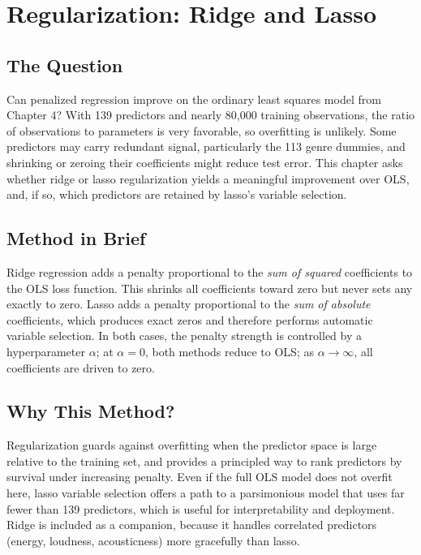 \documentclass[12pt, oneside]{book}
\begin{document}
\chapter{Regularization: Ridge and Lasso}
 
\section{The Question}
 
Can penalized regression improve on the ordinary least squares model from Chapter 4? With 139 predictors and nearly 80{,}000 training observations, the ratio of observations to parameters is very favorable, so overfitting is unlikely. Some predictors may carry redundant signal, particularly the 113 genre dummies, and shrinking or zeroing their coefficients might reduce test error. This chapter asks whether ridge or lasso regularization yields a meaningful improvement over OLS, and, if so, which predictors are retained by lasso's variable selection.
 
\section{Method in Brief}
 
Ridge regression adds a penalty proportional to the \textit{sum of squared} coefficients to the OLS loss function. This shrinks all coefficients toward zero but never sets any exactly to zero. Lasso adds a penalty proportional to the \textit{sum of absolute} coefficients, which produces exact zeros and therefore performs automatic variable selection. In both cases, the penalty strength is controlled by a hyperparameter $\alpha$; at $\alpha = 0$, both methods reduce to OLS; as $\alpha \to \infty$, all coefficients are driven to zero.
 
\section{Why This Method?}
 
Regularization guards against overfitting when the predictor space is large relative to the training set, and provides a principled way to rank predictors by survival under increasing penalty. Even if the full OLS model does not overfit here, lasso variable selection offers a path to a parsimonious model that uses far fewer than 139 predictors, which is useful for interpretability and deployment. Ridge is included as a companion, because it handles correlated predictors (energy, loudness, acousticness) more gracefully than lasso.
 
\end{document}
